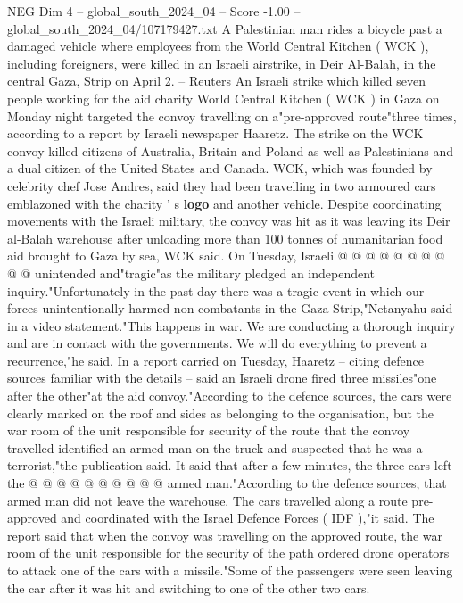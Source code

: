 \begin{textsample}{NEG Dim 4 – global\_south\_2024\_04 – Score -1.00 – global\_south\_2024\_04/107179427.txt}  \label{ex:f4_neg_197}
A Palestinian man rides a bicycle past a damaged vehicle where employees from the World Central Kitchen ( WCK ), including foreigners, were killed in an Israeli airstrike, in Deir Al-Balah, in the central Gaza, Strip on April 2. -- Reuters An Israeli strike which killed seven people working for the aid charity World Central Kitchen ( WCK ) in Gaza on Monday night targeted the convoy travelling on a"pre-approved route"three times, according to a report by Israeli newspaper Haaretz.
The strike on the WCK convoy killed citizens of Australia, Britain and Poland as well as Palestinians and a dual citizen of the United States and Canada.
WCK, which was founded by celebrity chef Jose Andres, said they had been travelling in two armoured cars emblazoned with the charity ' s \textbf{logo} and another vehicle.
Despite coordinating movements with the Israeli military, the convoy was hit as it was leaving its Deir al-Balah warehouse after unloading more than 100 tonnes of humanitarian food aid brought to Gaza by sea, WCK said.
On Tuesday, Israeli @ @ @ @ @ @ @ @ @ @ unintended and"tragic"as the military pledged an independent inquiry."Unfortunately in the past day there was a tragic event in which our forces unintentionally harmed non-combatants in the Gaza Strip,"Netanyahu said in a video statement."This happens in war.
We are conducting a thorough inquiry and are in contact with the governments.
We will do everything to prevent a recurrence,"he said.
In a report carried on Tuesday, Haaretz -- citing defence sources familiar with the details -- said an Israeli drone fired three missiles"one after the other"at the aid convoy."According to the defence sources, the cars were clearly marked on the roof and sides as belonging to the organisation, but the war room of the unit responsible for security of the route that the convoy travelled identified an armed man on the truck and suspected that he was a terrorist,"the publication said.
It said that after a few minutes, the three cars left the @ @ @ @ @ @ @ @ @ @ armed man."According to the defence sources, that armed man did not leave the warehouse.
The cars travelled along a route pre-approved and coordinated with the Israel Defence Forces ( IDF ),"it said.
The report said that when the convoy was travelling on the approved route, the war room of the unit responsible for the security of the path ordered drone operators to attack one of the cars with a missile."Some of the passengers were seen leaving the car after it was hit and switching to one of the other two cars.

\end{textsample}
